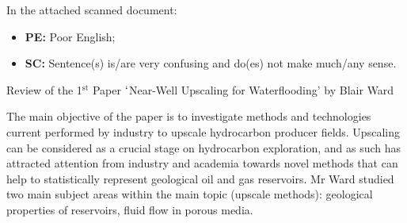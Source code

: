 \documentclass[14pt,twoside]{report}
\begin{document}
In the attached scanned document:
\begin{itemize}
\item {\bf PE:} Poor English;
\item {\bf SC:} Sentence(s) is/are very confusing and do(es) not make much/any sense.   
\end{itemize}
\medskip


\clearpage



\bigskip

\begin{center}
  {\Large Review of the 1$^{\text{st}}$ Paper $\lq$Near-Well Upscaling for Waterflooding' by Blair Ward}
\end{center}
The main objective of the paper is to investigate methods and technologies current performed by industry to upscale hydrocarbon producer fields. Upscaling can be considered as a crucial stage on hydrocarbon exploration, and as such has attracted attention from industry and academia towards novel methods that can help to statistically represent geological oil and gas reservoirs. Mr Ward studied two main subject areas within the main topic (upscale methods): geological properties of reservoirs, fluid flow in porous media.
\end{document}
